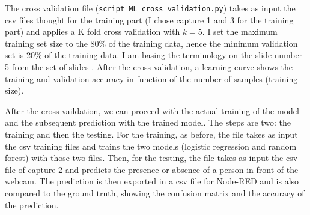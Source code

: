 The cross validation file (\texttt{script\_ML\_cross\_validation.py}) takes as input the csv files thought for the training part (I chose capture 1 and 3 for the training part) and applies a K fold cross validation with $k=5$. I set the maximum training set size to the 80\% of the training data, hence the minimum validation set is 20\% of the training data. I am basing the terminology on the slide number 5 from the set of slides \cite{matteucci2022neuralnetworkstraining}. After the cross validation, a learning curve shows the training and validation accuracy in function of the number of samples (training size).

After the cross vaildation, we can proceed with the actual training of the model and the subsequent prediction with the trained model. The steps are two: the training and then the testing. For the training, as before, the file takes as input the csv training files and trains the two models (logistic regression and random forest) with those two files. Then, for the testing, the file takes as input the csv file of capture 2 and predicts the presence or absence of a person in front of the webcam. The prediction is then exported in a csv file for Node-RED and is also compared to the ground truth, showing the confusion matrix and the accuracy of the prediction.